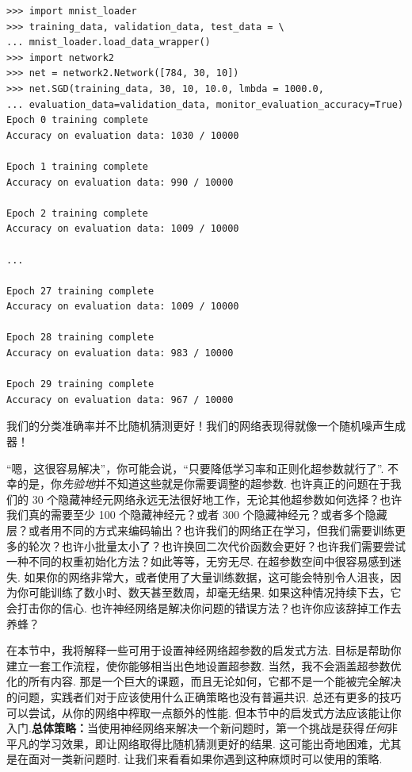 \begin{lstlisting}
>>> import mnist_loader
>>> training_data, validation_data, test_data = \
... mnist_loader.load_data_wrapper()
>>> import network2
>>> net = network2.Network([784, 30, 10])
>>> net.SGD(training_data, 30, 10, 10.0, lmbda = 1000.0,
... evaluation_data=validation_data, monitor_evaluation_accuracy=True)
Epoch 0 training complete
Accuracy on evaluation data: 1030 / 10000

Epoch 1 training complete
Accuracy on evaluation data: 990 / 10000

Epoch 2 training complete
Accuracy on evaluation data: 1009 / 10000

...

Epoch 27 training complete
Accuracy on evaluation data: 1009 / 10000

Epoch 28 training complete
Accuracy on evaluation data: 983 / 10000

Epoch 29 training complete
Accuracy on evaluation data: 967 / 10000

\end{lstlisting}

我们的分类准确率并不比随机猜测更好！我们的网络表现得就像一个随机噪声生成器！

``嗯，这很容易解决''，你可能会说，``只要降低学习率和正则化超参数就行了''. 不幸的是，你\emph{先验地}并不知道这些就是你需要调整的超参数. 也许真正的问题在于我们的 30 个隐藏神经元网络永远无法很好地工作，无论其他超参数如何选择？也许我们真的需要至少 100 个隐藏神经元？或者 300 个隐藏神经元？或者多个隐藏层？或者用不同的方式来编码输出？也许我们的网络正在学习，但我们需要训练更多的轮次？也许小批量太小了？也许换回二次代价函数会更好？也许我们需要尝试一种不同的权重初始化方法？如此等等，无穷无尽. 在超参数空间中很容易感到迷失. 如果你的网络非常大，或者使用了大量训练数据，这可能会特别令人沮丧，因为你可能训练了数小时、数天甚至数周，却毫无结果. 如果这种情况持续下去，它会打击你的信心. 也许神经网络是解决你问题的错误方法？也许你应该辞掉工作去养蜂？

在本节中，我将解释一些可用于设置神经网络超参数的启发式方法. 目标是帮助你建立一套工作流程，使你能够相当出色地设置超参数. 当然，我不会涵盖超参数优化的所有内容. 那是一个巨大的课题，而且无论如何，它都不是一个能被完全解决的问题，实践者们对于应该使用什么正确策略也没有普遍共识. 总还有更多的技巧可以尝试，从你的网络中榨取一点额外的性能. 但本节中的启发式方法应该能让你入门.\textbf{总体策略：}当使用神经网络来解决一个新问题时，第一个挑战是获得\emph{任何}非平凡的学习效果，即让网络取得比随机猜测更好的结果. 这可能出奇地困难，尤其是在面对一类新问题时. 让我们来看看如果你遇到这种麻烦时可以使用的策略.

